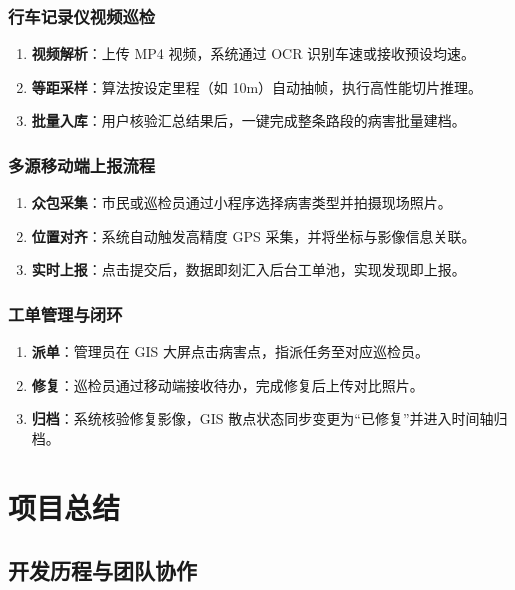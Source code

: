 \documentclass[UTF8, a4paper, fontset=ubuntu]{ctexart}
\begin{document}
\subsubsection{行车记录仪视频巡检}
\begin{enumerate}[label=\arabic*., nosep]
    \item \textbf{视频解析}：上传 MP4 视频，系统通过 OCR 识别车速或接收预设均速。
    \item \textbf{等距采样}：算法按设定里程（如 10m）自动抽帧，执行高性能切片推理。
    \item \textbf{批量入库}：用户核验汇总结果后，一键完成整条路段的病害批量建档。
\end{enumerate}

\subsubsection{多源移动端上报流程}
\begin{enumerate}[label=\arabic*., nosep]
    \item \textbf{众包采集}：市民或巡检员通过小程序选择病害类型并拍摄现场照片。
    \item \textbf{位置对齐}：系统自动触发高精度 GPS 采集，并将坐标与影像信息关联。
    \item \textbf{实时上报}：点击提交后，数据即刻汇入后台工单池，实现发现即上报。
\end{enumerate}

\subsubsection{工单管理与闭环}
\begin{enumerate}[label=\arabic*., nosep]
    \item \textbf{派单}：管理员在 GIS 大屏点击病害点，指派任务至对应巡检员。
    \item \textbf{修复}：巡检员通过移动端接收待办，完成修复后上传对比照片。
    \item \textbf{归档}：系统核验修复影像，GIS 散点状态同步变更为“已修复”并进入时间轴归档。
\end{enumerate}

\section{项目总结}

  \subsection{开发历程与团队协作}
\end{document}
